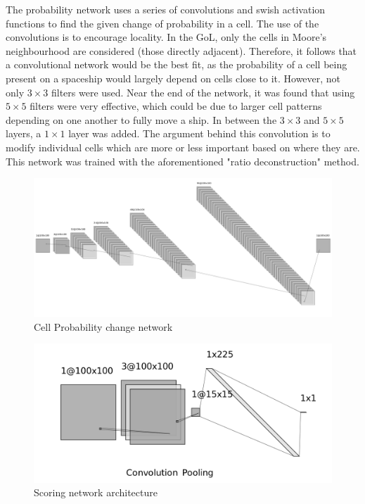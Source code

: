 \documentclass{l4proj}
\begin{document}
The probability network uses a series of convolutions and swish activation functions to find the given change of probability in a cell. The use of the convolutions is to encourage locality. In the GoL, only the cells in Moore's neighbourhood are considered (those directly adjacent). Therefore, it follows that a convolutional network would be the best fit, as the probability of a cell being present on a spaceship would largely depend on cells close to it. However, not only $3 \times 3$ filters were used. Near the end of the network, it was found that using $5 \times 5$ filters were very effective, which could be due to larger cell patterns depending on one another to fully move a ship. In between the $3 \times 3$ and $5 \times 5$ layers, a $1 \times 1$ layer was added. The argument behind this convolution is to modify individual cells which are more or less important based on where they are. This network was trained with the aforementioned "ratio deconstruction" method.

\begin{figure}[h]
\centering
\includegraphics[width=0.8\linewidth]{dissertation/images/diagrams/probability_network_diagram.png}
\caption{Cell Probability change network}
\label{fig:subim1}
\end{figure}
\begin{figure}[h]
\centering
\includegraphics[width=0.8\linewidth]{dissertation/images/diagrams/scoring_network_diagram.png}
\caption{Scoring network architecture}
\label{fig:subim1}
\end{figure}
\end{document}
